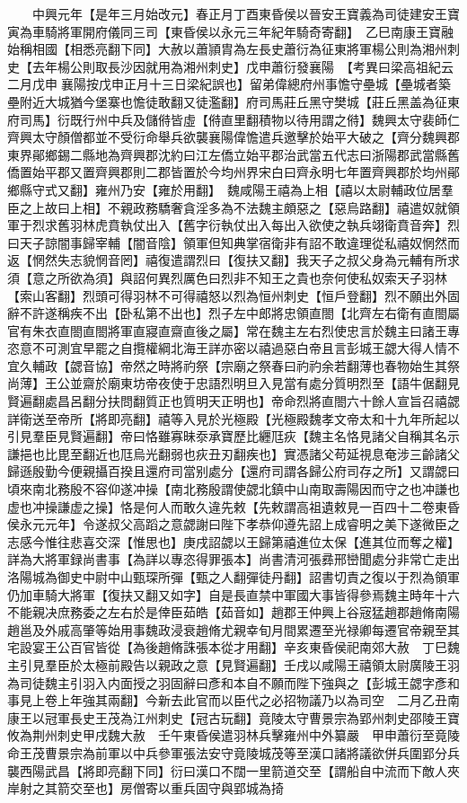 　　中興元年【是年三月始改元】春正月丁酉東昏侯以晉安王寶義為司徒建安王寶寅為車騎將軍開府儀同三司【東昏侯以永元三年紀年騎奇寄翻】　乙巳南康王寶融始稱相國【相悉亮翻下同】大赦以蕭頴胄為左長史蕭衍為征東將軍楊公則為湘州刺史【去年楊公則取長沙因就用為湘州刺史】戊申蕭衍發襄陽　【考異曰梁高祖紀云二月戊申襄陽按戊申正月十三日梁紀誤也】留弟偉總府州事憺守壘城【壘城者築壘附近大城猶今堡寨也憺徒敢翻又徒濫翻】府司馬莊丘黑守樊城【莊丘黑盖為征東府司馬】衍既行州中兵及儲偫皆虛【偫直里翻積物以待用謂之偫】魏興太守裴師仁齊興太守顏僧都並不受衍命舉兵欲襲襄陽偉憺遣兵邀擊於始平大破之【齊分魏興郡東界鄖鄉錫二縣地為齊興郡沈約曰江左僑立始平郡治武當五代志曰浙陽郡武當縣舊僑置始平郡又置齊興郡則二郡皆置於今均州界宋白曰齊永明七年置齊興郡於均州鄖鄉縣守式又翻】雍州乃安【雍於用翻】　魏咸陽王禧為上相【禧以太尉輔政位居羣臣之上故曰上相】不親政務驕奢貪淫多為不法魏主頗惡之【惡烏路翻】禧遣奴就領軍于烈求舊羽林虎賁執仗出入【舊字衍執仗出入每出入欲使之執兵翊衛賁音奔】烈曰天子諒闇事歸宰輔【闇音陰】領軍但知典掌宿衛非有詔不敢違理從私禧奴惘然而返【惘然失志貌惘音罔】禧復遣謂烈曰【復扶又翻】我天子之叔父身為元輔有所求須【意之所欲為須】與詔何異烈厲色曰烈非不知王之貴也奈何使私奴索天子羽林【索山客翻】烈頭可得羽林不可得禧怒以烈為恒州刺史【恒戶登翻】烈不願出外固辭不許遂稱疾不出【卧私第不出也】烈子左中郎將忠領直閤【北齊左右衛有直閤屬官有朱衣直閤直閤將軍直寢直齋直後之屬】常在魏主左右烈使忠言於魏主曰諸王專恣意不可測宜早罷之自攬權綱北海王詳亦密以禧過惡白帝且言彭城王勰大得人情不宜久輔政【勰音協】帝然之時將礿祭【宗廟之祭春曰礿礿余若翻薄也春物始生其祭尚薄】王公並齋於廟東坊帝夜使于忠語烈明旦入見當有處分質明烈至【語牛倨翻見賢遍翻處昌呂翻分扶問翻質正也質明天正明也】帝命烈將直閤六十餘人宣旨召禧勰詳衛送至帝所【將即亮翻】禧等入見於光極殿【光極殿魏孝文帝太和十九年所起以引見羣臣見賢遍翻】帝曰恪雖寡昧沗承寶歷比纒尫疢【魏主名恪見諸父自稱其名示謙挹也比毘至翻近也尫烏光翻弱也疢丑刃翻疾也】實憑諸父苟延視息奄涉三齡諸父歸遜殷勤今便親攝百揆且還府司當别處分【還府司謂各歸公府司存之所】又謂勰曰頃來南北務殷不容仰遂冲操【南北務殷謂使勰北鎮中山南取壽陽因而守之也冲謙也虚也冲操謙虚之操】恪是何人而敢久違先敕【先敕謂高祖遺敕見一百四十二卷東昏侯永元元年】令遂叔父高蹈之意勰謝曰陛下孝恭仰遵先詔上成睿明之美下遂微臣之志感今惟往悲喜交深【惟思也】庚戌詔勰以王歸第禧進位太保【進其位而奪之權】詳為大將軍録尚書事【為詳以專恣得罪張本】尚書清河張彞邢巒聞處分非常亡走出洛陽城為御史中尉中山甄琛所彈【甄之人翻彈徒丹翻】詔書切責之復以于烈為領軍仍加車騎大將軍【復扶又翻又如字】自是長直禁中軍國大事皆得參焉魏主時年十六不能親决庶務委之左右於是倖臣茹皓【茹音如】趙郡王仲興上谷宼猛趙郡趙脩南陽趙邕及外戚高肇等始用事魏政浸衰趙脩尤親幸旬月間累遷至光禄卿每遷官帝親至其宅設宴王公百官皆從【為後趙脩誅張本從才用翻】辛亥東昏侯祀南郊大赦　丁巳魏主引見羣臣於太極前殿告以親政之意【見賢遍翻】壬戌以咸陽王禧領太尉廣陵王羽為司徒魏主引羽入内面授之羽固辭曰彥和本自不願而陛下強與之【彭城王勰字彥和事見上卷上年強其兩翻】今新去此官而以臣代之必招物議乃以為司空　二月乙丑南康王以冠軍長史王茂為江州刺史【冠古玩翻】竟陵太守曹景宗為郢州刺史邵陵王寶攸為荆州刺史甲戌魏大赦　壬午東昏侯遣羽林兵擊雍州中外纂嚴　甲申蕭衍至竟陵命王茂曹景宗為前軍以中兵參軍張法安守竟陵城茂等至漢口諸將議欲併兵圍郢分兵襲西陽武昌【將即亮翻下同】衍曰漢口不闊一里箭道交至【謂船自中流而下敵人夾岸射之其箭交至也】房僧寄以重兵固守與郢城為掎